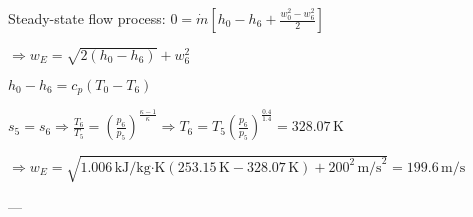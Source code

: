Steady-state flow process:  
\( 0 = \dot{m} \left[ h_0 - h_6 + \frac{w_0^2 - w_6^2}{2} \right] \)  

\( \Rightarrow w_E = \sqrt{2 (h_0 - h_6)} + w_6^2 \)  

\( h_0 - h_6 = c_p (T_0 - T_6) \)  

\( s_5 = s_6 \Rightarrow \frac{T_6}{T_5} = \left( \frac{p_6}{p_5} \right)^{\frac{\kappa - 1}{\kappa}} \Rightarrow T_6 = T_5 \left( \frac{p_6}{p_5} \right)^{\frac{0.4}{1.4}} = 328.07 \, \text{K} \)  

\( \Rightarrow w_E = \sqrt{1.006 \, \text{kJ/kg·K} \left( 253.15 \, \text{K} - 328.07 \, \text{K} \right) + 200^2 \, \text{m/s}^2} = 199.6 \, \text{m/s} \)  

---